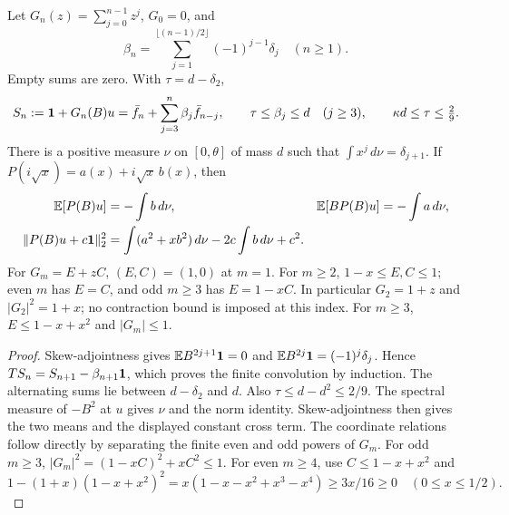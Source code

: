 \begin{lemma}\label{lem:odd-common:spectral}
Let \(G_n(z)=\sum_{j=0}^{n-1}z^j\), \(G_0=0\), and
\[
 \beta_n=\sum_{j=1}^{\lfloor(n-1)/2\rfloor}(-1)^{j-1}\delta_j
 \quad(n\ge1).
\]
Empty sums are zero. With \(\tau=d-\delta_2\),
\begin{equation}\label{eq:Q188:conv}
 S_n:=\mathbf1+G_n(B)u
   =\bar f_n+\sum_{j=3}^{n}\beta_j\bar f_{n-j},\qquad
 \tau\le\beta_j\le d\quad(j\ge3),\qquad
 \kappa d\le\tau\le\tfrac29.
\end{equation}
There is a positive measure \(\nu\) on \([0,\theta]\) of mass \(d\)
such that \(\int x^j\,d\nu=\delta_{j+1}\). If
\(P(i\sqrt x)=a(x)+i\sqrt x\,b(x)\), then
\begin{equation}\label{eq:odd-common:coordinates}
\begin{aligned}
 \mathbb E[P(B)u]&=-\int b\,d\nu,&
 \mathbb E[BP(B)u]&=-\int a\,d\nu,\\
 \|P(B)u+c\mathbf1\|_2^2
   &=\int(a^2+xb^2)\,d\nu-2c\int b\,d\nu+c^2.
\end{aligned}
\end{equation}
For \(G_m=E+zC\), \((E,C)=(1,0)\) at \(m=1\). For \(m\ge2\),
\(1-x\le E,C\le1\); even \(m\) has \(E=C\), and odd \(m\ge3\)
has \(E=1-xC\). In particular \(G_2=1+z\) and
\(|G_2|^2=1+x\); no contraction bound is imposed at this index.
For \(m\ge3\), \(E\le1-x+x^2\) and \(|G_m|\le1\).
\end{lemma}

\begin{proof}
Skew-adjointness gives
\(\mathbb E B^{2j+1}\mathbf1=0\) and
\(\mathbb E B^{2j}\mathbf1=(-1)^j\delta_j\).
Hence \(TS_n=S_{n+1}-\beta_{n+1}\mathbf1\), which proves the finite
convolution by induction. The alternating sums lie between
\(d-\delta_2\) and \(d\). Also
\(\tau\le d-d^2\le2/9\).
The spectral measure of \(-B^2\) at \(u\) gives \(\nu\) and the norm
identity. Skew-adjointness then gives the two means and the displayed
constant cross term. The coordinate relations follow directly by
separating the finite even and odd powers of \(G_m\).
For odd \(m\ge3\),
\(|G_m|^2=(1-xC)^2+xC^2\le1\).
For even \(m\ge4\), use \(C\le1-x+x^2\) and
\[
 1-(1+x)(1-x+x^2)^2
 =x(1-x-x^2+x^3-x^4)\ge3x/16\ge0
 \quad(0\le x\le1/2).
\]
\end{proof}

